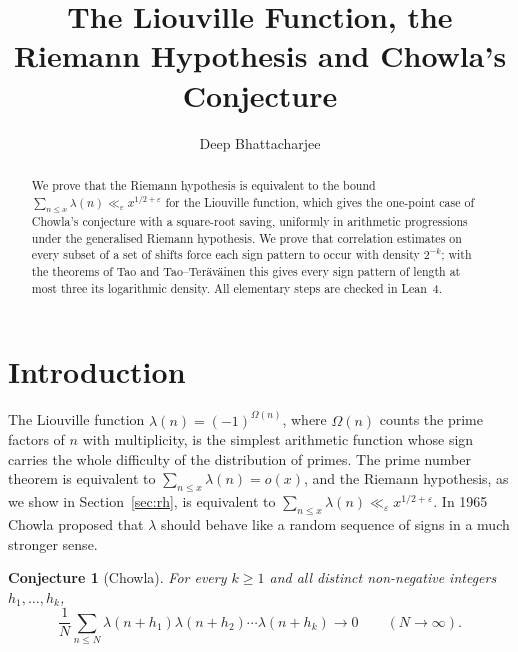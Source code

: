 \documentclass[11pt]{amsart}
\title{The Liouville Function, the Riemann Hypothesis and Chowla's Conjecture}
\author{Deep Bhattacharjee}
\numberwithin{equation}{section}
\theoremstyle{plain}
\newtheorem{conj}[thm]{Conjecture}
\theoremstyle{definition}
\theoremstyle{remark}
\begin{document}
\begin{abstract}
We prove that the Riemann hypothesis is equivalent to the bound $\sum_{n\le x}\lambda(n)\ll_\varepsilon x^{1/2+\varepsilon}$ for the Liouville function, which gives the one-point case of Chowla's conjecture with a square-root saving, uniformly in arithmetic progressions under the generalised Riemann hypothesis. We prove that correlation estimates on every subset of a set of shifts force each sign pattern to occur with density $2^{-k}$; with the theorems of Tao and Tao--Teräväinen this gives every sign pattern of length at most three its logarithmic density. All elementary steps are checked in Lean~4.
\end{abstract}
\maketitle

\section{Introduction}

The Liouville function $\lambda(n)=(-1)^{\Omega(n)}$, where $\Omega(n)$ counts the prime factors of $n$ with multiplicity, is the simplest arithmetic function whose sign carries the whole difficulty of the distribution of primes. The prime number theorem is equivalent to $\sum_{n\le x}\lambda(n)=o(x)$, and the Riemann hypothesis, as we show in Section~\ref{sec:rh}, is equivalent to $\sum_{n\le x}\lambda(n)\ll_\varepsilon x^{1/2+\varepsilon}$. In 1965 Chowla \cite{Cho65} proposed that $\lambda$ should behave like a random sequence of signs in a much stronger sense.

\begin{conj}[Chowla]\label{conj:chowla}
For every $k\ge1$ and all distinct non-negative integers $h_1,\dots,h_k$,
\begin{equation}\label{eq:chowla}
\frac1N\sum_{n\le N}\lambda(n+h_1)\lambda(n+h_2)\cdots\lambda(n+h_k)\longrightarrow 0\qquad(N\to\infty).
\end{equation}
\end{conj}
\end{document}
